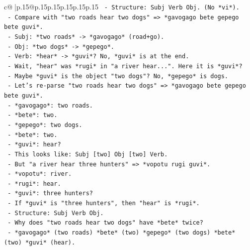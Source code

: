 \documentclass{article}
\begin{document}
{\begin{supertabular}{c@{$\;$}|p{.15\linewidth}@{}p{.15\linewidth}p{.15\linewidth}p{.15\linewidth}p{.15\linewidth}p{.15\linewidth}}
{{{\texttt{                         {-} Structure: Subj Verb Obj. (No *vi*).} \\
\texttt{                       {-} Compare with "two roads hear two dogs" => *gavogago bete gepego bete guvi*.} \\
\texttt{                         {-} Subj: *two roads* {-}> *gavogago* (road+go).} \\
\texttt{                         {-} Obj: *two dogs* {-}> *gepego*.} \\
\texttt{                         {-} Verb: *hear* {-}> *guvi*? No, *guvi* is at the end.} \\
\texttt{                         {-} Wait, "hear" was *rugi* in "a river hear...". Here it is *guvi*?} \\
\texttt{                         {-} Maybe *guvi* is the object "two dogs"? No, *gepego* is dogs.} \\
\texttt{                         {-} Let's re{-}parse "two roads hear two dogs" => *gavogago bete gepego bete guvi*.} \\
\texttt{                           {-} *gavogago*: two roads.} \\
\texttt{                           {-} *bete*: two.} \\
\texttt{                           {-} *gepego*: two dogs.} \\
\texttt{                           {-} *bete*: two.} \\
\texttt{                           {-} *guvi*: hear?} \\
\texttt{                           {-} This looks like: Subj {[}two{]} Obj {[}two{]} Verb.} \\
\texttt{                           {-} But "a river hear three hunters" => *vopotu rugi guvi*.} \\
\texttt{                             {-} *vopotu*: river.} \\
\texttt{                             {-} *rugi*: hear.} \\
\texttt{                             {-} *guvi*: three hunters?} \\
\texttt{                             {-} If *guvi* is "three hunters", then "hear" is *rugi*.} \\
\texttt{                             {-} Structure: Subj Verb Obj.} \\
\texttt{                           {-} Why does "two roads hear two dogs" have *bete* twice?} \\
\texttt{                             {-} *gavogago* (two roads) *bete* (two) *gepego* (two dogs) *bete* (two) *guvi* (hear).} \\
}}}
\end{supertabular}}
\end{document}
